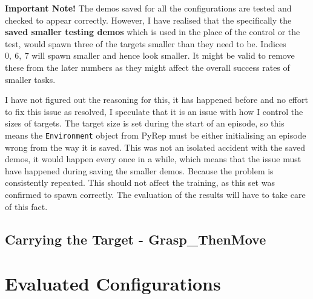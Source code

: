 \textbf{Important Note!}
The demos saved for all the configurations are tested and checked to appear correctly. However, I have realised that the specifically the \textbf{saved smaller testing demos} which is used in the place of the control or the test, would spawn three of the targets smaller than they need to be. Indices  \(0, ~6, ~7\)  will spawn smaller and hence look smaller. It might be valid to remove these from the later numbers as they might affect the overall success rates of smaller tasks. 

I have not figured out the reasoning for this, it has happened before and no effort to fix this issue as resolved, I speculate that it is an issue with how I control the sizes of targets. The target size is set during the start of an episode, so this means the \verb|Environment| object from PyRep must be either initialising an episode wrong from the way it is saved. This was not an isolated accident with the saved demos, it would happen every once in a while, which means that the issue must have happened during saving the smaller demos. Because the problem is consistently repeated. This should not affect the training, as this set was confirmed to spawn correctly. The evaluation of the results will have to take care of this fact.


\subsection{Carrying the Target - \textbf{Grasp\_ThenMove}}

\section{Evaluated Configurations}